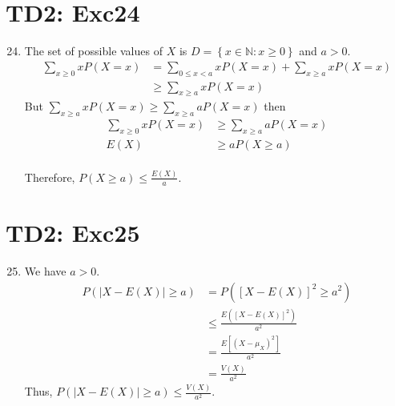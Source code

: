 \documentclass[serif,t]{beamer}
\begin{document}
    \section{TD2: Exc24}
    \begin{frame}[allowframebreaks]
        \begin{enumerate}
            \setcounter{enumi}{23}
            \item The set of possible values of $ X $ is $ D=\left\{ x\in\mathbb{N}:x\geq 0 \right\} $ and $ a>0. $
            \begin{align*}
            \sum_{x\geq 0} xP(X=x) &=\sum_{0\leq x<a} xP(X=x)+\sum_{x\geq a}xP(X=x)\\
            &\geq \sum_{x\geq a}xP(X=x)
            \end{align*}
            But $ \sum_{x\geq a}xP(X=x)\geq \sum_{x\geq a}aP(X=x) $ then
            \begin{align*}
            \sum_{x\geq 0} xP(X=x) &\geq \sum_{x\geq a}aP(X=x)\\
            E(X) &\geq aP(X\geq a)
            \end{align*}\\
            Therefore, $ P(X\geq a)\leq \frac{E(X)}{a}. $
        \end{enumerate}
    \end{frame}
    \section{TD2: Exc25}
    \begin{frame}[allowframebreaks]
        \begin{enumerate}
            \setcounter{enumi}{24}
            \item We have $ a>0. $
            \begin{align*}
            P(|X-E(X)|\geq a) &=P([X-E(X)]^{2}\geq a^{2})\\
            &\leq \frac{E([X-E(X)]^{2})}{a^{2}}\\
            &=\frac{E[(X-\mu_{X})^{2}]}{a^{2}}\\
            &=\frac{V(X)}{a^{2}}
            \end{align*}
            Thus, $ P(|X-E(X)|\geq a)\leq \frac{V(X)}{a^{2}}. $
        \end{enumerate}
    \end{frame}
\end{document}
